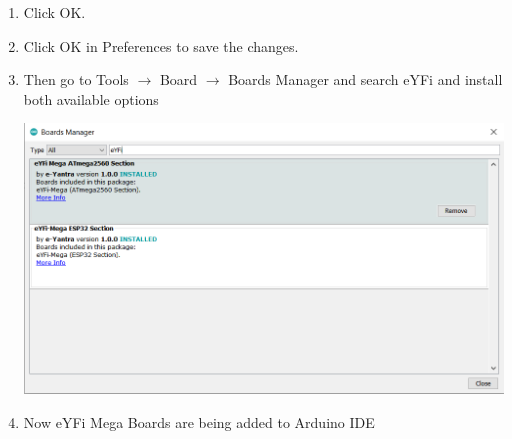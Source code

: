 \documentclass[12pt,a4paper,oneside]{book}
\begin{document}
\begin{enumerate}
\begin{itemize}
                    \end{itemize}  
                 \item Click OK.
                 \item Click OK in Preferences to save the changes.
                 \item Then go to Tools $\to$ Board $\to$ Boards Manager and search eYFi \newline and install both available options
                \begin{center}
                    \includegraphics[scale=0.85]{BOARDS MANAGER}
                \end{center}
                \item Now eYFi Mega Boards are being added to Arduino IDE
            \end{enumerate}
    \pagebreak
\end{document}
